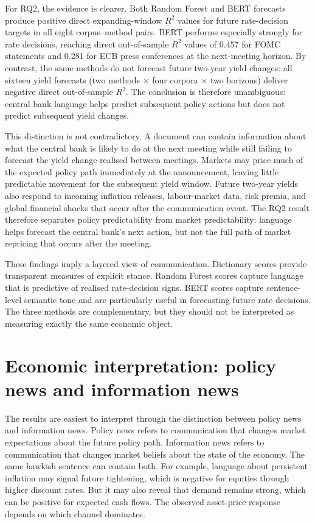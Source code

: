 For RQ2, the evidence is clearer. Both Random Forest and BERT forecasts
produce positive direct expanding-window $R^2$ values for future rate-decision
targets in all eight corpus--method pairs. BERT performs especially
strongly for rate decisions, reaching direct out-of-sample $R^2$ values of
0.457 for FOMC statements and 0.281 for ECB press conferences at the
next-meeting horizon. By contrast, the same methods do not forecast future
two-year yield changes: all sixteen yield forecasts (two methods $\times$ four
corpora $\times$ two horizons) deliver negative direct out-of-sample $R^2$.
The conclusion is therefore unambiguous: central bank language helps predict
subsequent policy actions but does not predict subsequent yield changes.

This distinction is not contradictory. A document can contain information about
what the central bank is likely to do at the next meeting while still failing to
forecast the yield change realised between meetings. Markets may price much of
the expected policy path immediately at the announcement, leaving little
predictable movement for the subsequent yield window. Future two-year yields also
respond to incoming inflation releases, labour-market data, risk premia, and
global financial shocks that occur after the communication event. The RQ2 result
therefore separates policy predictability from market predictability: language
helps forecast the central bank's next action, but not the full path of market
repricing that occurs after the meeting.

These findings imply a layered view of communication. Dictionary scores provide
transparent measures of explicit stance. Random Forest scores capture language
that is predictive of realised rate-decision signs. BERT scores capture
sentence-level semantic tone and are particularly useful in forecasting future
rate decisions. The three methods are complementary, but they should not be
interpreted as measuring exactly the same economic object.

\section{Economic interpretation: policy news and information news}
\label{sec:disc_policy_information}

The results are easiest to interpret through the distinction between policy news
and information news. Policy news refers to communication that changes market
expectations about the future policy path. Information news refers to
communication that changes market beliefs about the state of the economy. The
same hawkish sentence can contain both. For example, language about persistent
inflation may signal future tightening, which is negative for equities through
higher discount rates. But it may also reveal that demand remains strong, which
can be positive for expected cash flows. The observed asset-price response
depends on which channel dominates.

